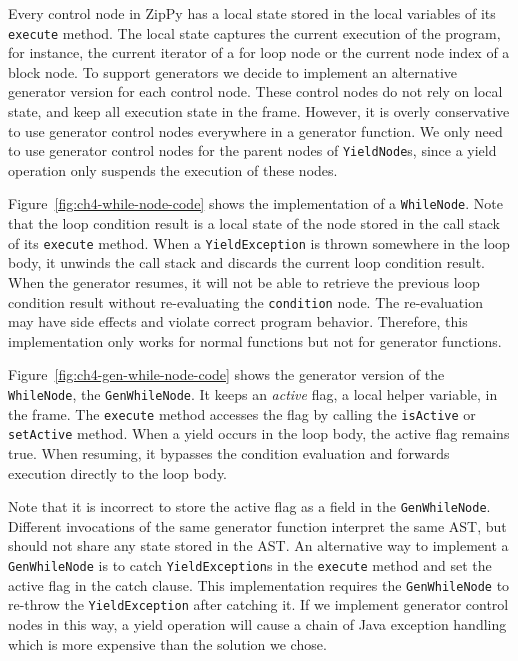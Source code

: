 Every control node in ZipPy has a local state stored in the local variables of its \texttt{execute} method.
The local state captures the current execution of the program, for instance, the current iterator of a for loop node or the current node index of a block node.
To support generators we decide to implement an alternative generator version for each control node.
These control nodes do not rely on local state, and keep all execution state in the frame.
However, it is overly conservative to use generator control nodes everywhere in a generator function.
We only need to use generator control nodes for the parent nodes of \texttt{YieldNode}s, since a yield operation only suspends the execution of these nodes.

Figure~\ref{fig:ch4-while-node-code} shows the implementation of a \texttt{WhileNode}.
Note that the loop condition result is a local state of the node stored in the call stack of its \texttt{execute} method.
When a \texttt{YieldException} is thrown somewhere in the loop body, it unwinds the call stack and discards the current loop condition result.
When the generator resumes, it will not be able to retrieve the previous loop condition result without re-evaluating the \texttt{condition} node.
The re-evaluation may have side effects and violate correct program behavior.
Therefore, this implementation only works for normal functions but not for generator functions.

Figure~\ref{fig:ch4-gen-while-node-code} shows the generator version of the \texttt{WhileNode}, the \texttt{GenWhileNode}.
It keeps an \emph{active} flag, a local helper variable, in the frame.
The \texttt{execute} method accesses the flag by calling the \texttt{isActive} or \texttt{setActive} method.
When a yield occurs in the loop body, the active flag remains true.
When resuming, it bypasses the condition evaluation and forwards execution directly to the loop body.

Note that it is incorrect to store the active flag as a field in the \texttt{GenWhileNode}.
Different invocations of the same generator function interpret the same AST, but should not share any state stored in the AST.
An alternative way to implement a \texttt{GenWhileNode} is to catch \texttt{YieldException}s in the \texttt{execute} method and set the active flag in the catch clause.
This implementation requires the \texttt{GenWhileNode} to re-throw the \texttt{YieldException} after catching it.
If we implement generator control nodes in this way, a yield operation will cause a chain of Java exception handling which is more expensive than the solution we chose.

